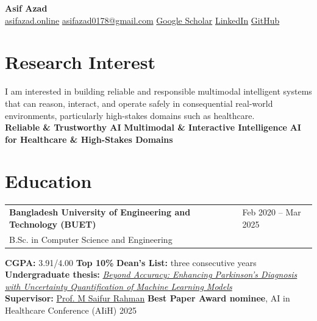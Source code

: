 \documentclass[10pt,letterpaper]{article}
\makeatletter
\newenvironment{entry}
    {\begin{minipage}{\linewidth}\color{textColor}}
    {\end{minipage}}
\newcommand{\daterow}[3]{%
    \begin{tabularx}{\linewidth}{@{}X>{\raggedleft\arraybackslash}p{3.8cm}@{}}
        #1 & \textcolor{mutedColor}{#2}\\
        #3 &
    \end{tabularx}
}
\makeatother
\begin{document}
\begin{center}
    {\fontsize{22pt}{25pt}\selectfont\bfseries\color{primaryColor} Asif Azad}\\[0.32em]
    \href{https://asifazad.online/}{asifazad.online}
    \enspace\textcolor{mutedColor}{\textbar}\enspace
    \href{mailto:asifazad0178@gmail.com}{asifazad0178@gmail.com}
    \enspace\textcolor{mutedColor}{\textbar}\enspace
    \href{https://scholar.google.com/citations?user=nDhZSTQAAAAJ}{Google Scholar}
    \enspace\textcolor{mutedColor}{\textbar}\enspace
    \href{https://www.linkedin.com/in/asifazad2677}{LinkedIn}
    \enspace\textcolor{mutedColor}{\textbar}\enspace
    \href{https://github.com/BRAINIAC2677}{GitHub}
\end{center}
\vspace{-0.35em}

\section{Research Interest}
\begin{entry}
I am interested in building reliable and responsible multimodal intelligent systems that can reason, interact, and operate safely in consequential real-world environments, particularly high-stakes domains such as healthcare.\\[0.38em]
\textbf{Reliable \& Trustworthy AI}
\enspace\textcolor{primaryColor}{\textbullet}\enspace
\textbf{Multimodal \& Interactive Intelligence}
\enspace\textcolor{primaryColor}{\textbullet}\enspace
\textbf{AI for Healthcare \& High-Stakes Domains}
\end{entry}

\section{Education}
\begin{entry}
\daterow
    {\textbf{Bangladesh University of Engineering and Technology (BUET)}}
    {Feb 2020 -- Mar 2025}
    {B.Sc. in Computer Science and Engineering}
\vspace{0.16em}
\textbf{CGPA:} 3.91/4.00
\enspace\textcolor{mutedColor}{\textbar}\enspace
\textbf{Top 10\%}
\enspace\textcolor{mutedColor}{\textbar}\enspace
\textbf{Dean's List:} three consecutive years\\[0.28em]
\textbf{Undergraduate thesis:}
\href{https://link.springer.com/chapter/10.1007/978-3-032-00652-3_3}{\textit{Beyond Accuracy: Enhancing Parkinson's Diagnosis with Uncertainty Quantification of Machine Learning Models}}\\[0.28em]
\textbf{Supervisor:} \href{https://cse.buet.ac.bd/faculty/faculty_detail/mrahman}{Prof. M Saifur Rahman}
\enspace\textcolor{mutedColor}{\textbar}\enspace
\textbf{Best Paper Award nominee}, AI in Healthcare Conference (AIiH) 2025
\end{entry}
\end{document}
